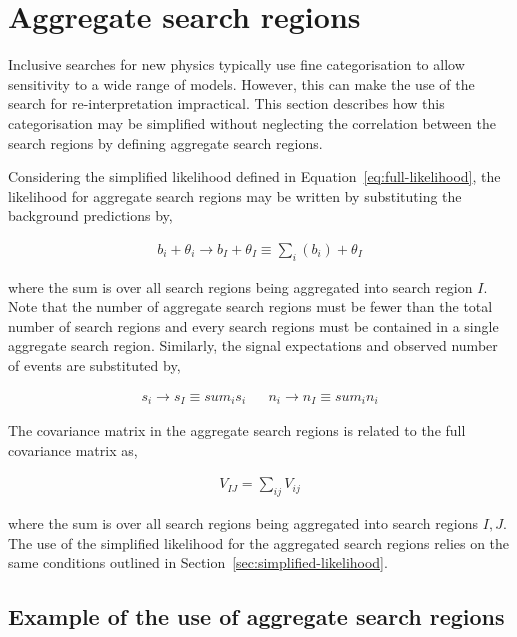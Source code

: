 \section{Aggregate search regions}
\label{sec:aggregate-signal-regions}

Inclusive searches for new physics typically use fine categorisation to allow
sensitivity to a wide range of models. However, this can make the use
of the search for re-interpretation impractical. 
This section describes how this categorisation may be simplified without neglecting the correlation 
between the search regions by defining aggregate search regions.

Considering the simplified likelihood defined in Equation~\ref{eq:full-likelihood},
the likelihood for aggregate search regions may be written by substituting the 
background predictions by,

\begin{align}
b_{i} + \theta_i \rightarrow b_I + \theta_I \equiv \sum_{i}(b_{i}) + \theta_I
\label{eq:b-agg}
\end{align}

where the sum is over all search regions being aggregated into search region $I$.
Note that the number of aggregate search regions must be fewer than the total number of search regions and 
every search regions must be contained in a single aggregate search region. 
Similarly, the signal expectations and observed number of events are substituted by, 

\begin{align}
 s_{i}  \rightarrow s_{I} \equiv sum_{i}s_{i}  &&  n_{i}  \rightarrow n_{I} \equiv sum_{i}n_{i} 
\label{eq:b-agg}
\end{align}


The covariance matrix in the aggregate search regions is related to the full covariance matrix as, 

\begin{align}
V_{IJ}=\sum_{ij}V_{ij}
\label{eq:agg-cov}
\end{align}

where the sum is over all search regions being aggregated into search regions $I,J$.  The use of the simplified likelihood 
for the aggregated search regions relies on the same conditions outlined in Section~\ref{sec:simplified-likelihood}. 

\subsection{Example of the use of aggregate search regions}
\label{sec:agg-toy}

